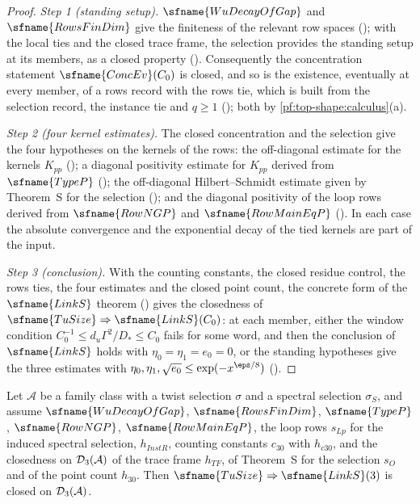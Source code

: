 \begin{proof}
\emph{Step 1 (standing setup).} $\sfname{WuDecayOfGap}$ and $\sfname{RowsFinDim}$ give the finiteness of the relevant
row spaces (); with the local ties and the closed trace frame, the selection
provides the standing setup at its members, as a closed property
(). Consequently the concentration statement $\sfname{ConcEv}(C_0)$ is
closed, and so is the existence, eventually at every member, of a rows record with the rows tie, which is built from
the selection record, the instance tie and $q\ge1$ (); both by
\cref{pf:top-shape:calculus}(a).

\emph{Step 2 (four kernel estimates).} The closed concentration and the selection give the four hypotheses on the
kernels of the rows: the off-diagonal estimate for the kernels $K_{pp}$
(); a diagonal positivity estimate for $K_{pp}$ derived from
$\sfname{TypeP}$ (); the off-diagonal Hilbert--Schmidt estimate given
by Theorem~S for the selection (); and the diagonal positivity of the
loop rows derived from $\sfname{RowNGP}$ and $\sfname{RowMainEqP}$ ().
In each case the absolute convergence and the exponential decay of the tied kernels are part of the input.

\emph{Step 3 (conclusion).} With the counting constants, the closed residue control, the rows ties, the four
estimates and the closed point count, the concrete form of the $\sfname{LinkS}$ theorem
() gives the closedness of
$\sfname{TuSize}\Rightarrow\sfname{LinkS}(C_0)$: at each member, either the window condition $C_0^{-1}\le
d_u\Gamma^2/D_*\le C_0$ fails for some word, and then the conclusion of $\sfname{LinkS}$ holds with $\eta_0=\eta_1=e_0=0$,
or the standing hypotheses give the three estimates with $\eta_0,\eta_1,\sqrt{e_0}\le\exp(-x^{\eps/8})$
().
\end{proof}

\begin{corollary}\label{pf:top-shape:linkS}
Let $\mathcal A$ be a family class with a twist selection $\sigma$ and a spectral selection $\sigma_S$, and assume
$\sfname{WuDecayOfGap}$, $\sfname{RowsFinDim}$, $\sfname{TypeP}$, $\sfname{RowNGP}$, $\sfname{RowMainEqP}$, the
loop rows $s_{Lp}$ for the induced spectral selection, $h_{InstR}$, counting constants $c_{30}$ with $h_{c30}$, and the
closedness on $\mathcal{D}_3(\mathcal A)$ of the trace frame $h_{TF}$, of Theorem~S for the selection $s_O$ and of the
point count $h_{30}$. Then $\sfname{TuSize}\Rightarrow\sfname{LinkS}(3)$ is closed on $\mathcal{D}_3(\mathcal A)$.
\end{corollary}

